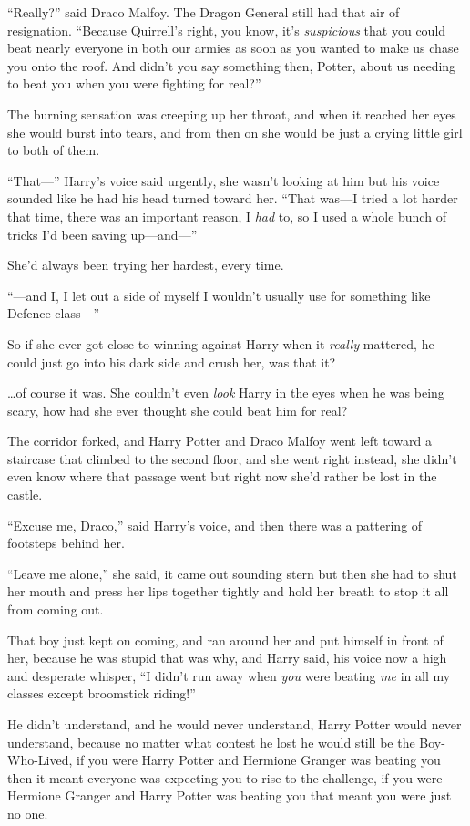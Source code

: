 ``Really?'' said Draco Malfoy. The Dragon General still had that air of
resignation. ``Because Quirrell's right, you know, it's
\emph{suspicious} that you could beat nearly everyone in both our armies
as soon as you wanted to make us chase you onto the roof. And didn't you
say something then, Potter, about us needing to beat you when you were
fighting for real?''

The burning sensation was creeping up her throat, and when it reached
her eyes she would burst into tears, and from then on she would be just
a crying little girl to both of them.

``That---'' Harry's voice said urgently, she wasn't looking at him but
his voice sounded like he had his head turned toward her. ``That was---I
tried a lot harder that time, there was an important reason, I
\emph{had} to, so I used a whole bunch of tricks I'd been saving
up---and---''

She'd always been trying her hardest, every time.

``---and I, I let out a side of myself I wouldn't usually use for
something like Defence class---''

So if she ever got close to winning against Harry when it \emph{really}
mattered, he could just go into his dark side and crush her, was that
it?

\ldots{}of course it was. She couldn't even \emph{look} Harry in the
eyes when he was being scary, how had she ever thought she could beat
him for real?

The corridor forked, and Harry Potter and Draco Malfoy went left toward
a staircase that climbed to the second floor, and she went right
instead, she didn't even know where that passage went but right now
she'd rather be lost in the castle.

``Excuse me, Draco,'' said Harry's voice, and then there was a pattering
of footsteps behind her.

``Leave me alone,'' she said, it came out sounding stern but then she
had to shut her mouth and press her lips together tightly and hold her
breath to stop it all from coming out.

That boy just kept on coming, and ran around her and put himself in
front of her, because he was stupid that was why, and Harry said, his
voice now a high and desperate whisper, ``I didn't run away when
\emph{you} were beating \emph{me} in all my classes except broomstick
riding!''

He didn't understand, and he would never understand, Harry Potter would
never understand, because no matter what contest he lost he would still
be the Boy-Who-Lived, if you were Harry Potter and Hermione Granger was
beating you then it meant everyone was expecting you to rise to the
challenge, if you were Hermione Granger and Harry Potter was beating you
that meant you were just no one.

